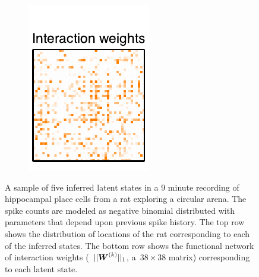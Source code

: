\documentclass[aos,noinfoline]{imsart} %
\begin{document}
\begin{figure}[t!]
\begin{subfigure}[T]{1.2in}
    \includegraphics[width=\textwidth]{network5}
  \end{subfigure}
\vspace{-.5em}
\caption{A sample of five inferred latent states in a 9 minute recording of hippocampal place cells from a rat exploring a circular arena. The spike counts are modeled as negative binomial distributed with parameters that depend upon previous spike history. The top row shows the distribution of locations of the rat corresponding to each of the inferred states. The bottom row shows the functional network of interaction weights (~$||\boldsymbol{W}^{(k)}||_1$, a~$38\times 38$ matrix) corresponding to each latent state.}
\label{fig:figure1}

\end{figure}
\end{document}
